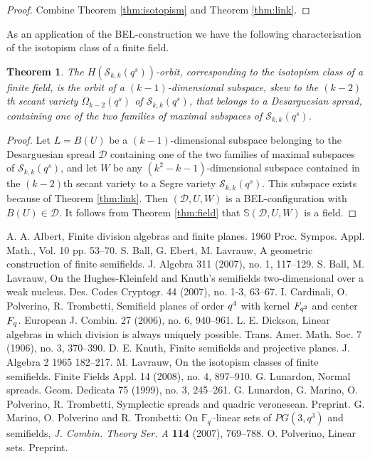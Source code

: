 \documentclass[12pt]{amsart}
\newtheorem{theorem}{\sc Theorem}[section]
\def\S{\mathbb{S}}
\def\D{\mathcal{D}}
\begin{document}
\begin{proof}
Combine Theorem \ref{thm:isotopism} and Theorem \ref{thm:link}.
\end{proof}
As an application of the BEL-construction we have the following characterisation of the isotopism class of a finite field.
\begin{theorem}
The  $H({\mathcal S}_{k,k}(q^s))$-orbit, corresponding to the isotopism class of a finite field, is the orbit of a $(k-1)$-dimensional subspace, skew to the $(k-2)$th secant variety $\Omega_{k-2}(q^s)$ of ${\mathcal S}_{k,k}(q^s)$, that belongs to a Desarguesian spread, containing one of the two families of maximal subspaces of ${\mathcal S}_{k,k}(q^s)$.
\end{theorem}
\begin{proof}
Let $L=B(U)$ be a $(k-1)$-dimensional subspace belonging to the Desarguesian spread $\D$ containing one of the two families of maximal subspaces of ${\mathcal S}_{k,k}(q^s)$, and let $W$ be any $(k^2-k-1)$-dimensional subspace contained in the $(k-2)$th secant variety to a Segre variety ${\mathcal S}_{k,k}(q^s)$. This subspace exists because of Theorem \ref{thm:link}. Then $(\D,U,W)$ is a BEL-configuration with $B(U)\in \D$. It follows from Theorem \ref{thm:field} that $\S(\D,U,W)$ is a field.
\end{proof}

\begin{thebibliography}{}
{\sc A. A. Albert}, Finite division algebras and finite planes.  1960  Proc. Sympos. Appl. Math., Vol. 10  pp. 53--70.
{\sc S. Ball, G. Ebert, M. Lavrauw}, A geometric construction of finite semifields.  J. Algebra  311  (2007),  no. 1, 117--129.
{\sc S. Ball, M. Lavrauw}, On the Hughes-Kleinfeld and Knuth's semifields two-dimensional over a weak nucleus.  Des. Codes Cryptogr.  44  (2007),  no. 1-3, 63--67. 
{\sc I. Cardinali, O. Polverino, R. Trombetti}, Semifield planes of order $q\sp 4$ with kernel $F\sb {q\sp 2}$ and center $F\sb q$.  European J. Combin.  27  (2006),  no. 6, 940--961.
{\sc L. E. Dickson}, Linear algebras in which division is always uniquely possible.  Trans. Amer. Math. Soc.  7  (1906),  no. 3, 370--390.
{\sc D. E. Knuth}, Finite semifields and projective planes.  J. Algebra  2  1965 182--217.
{\sc M. Lavrauw}, On the isotopism classes of finite semifields.  Finite Fields Appl.  14  (2008),  no. 4, 897--910.
{\sc G. Lunardon}, Normal spreads.  Geom. Dedicata  75  (1999),  no. 3, 245--261.
{\sc G. Lunardon, G. Marino, O. Polverino, R. Trombetti}, Symplectic spreads and quadric veronesean. Preprint.
 {\sc G. Marino, O. Polverino and R. Trombetti}: On ${\mathbb F}_q$--linear sets of $PG(3,q^3)$ and semifields,
{\it J. Combin. Theory Ser. A} {\bf 114} (2007), 769--788.
{\sc O. Polverino}, Linear sets. Preprint.
\end{thebibliography}
\end{document}
